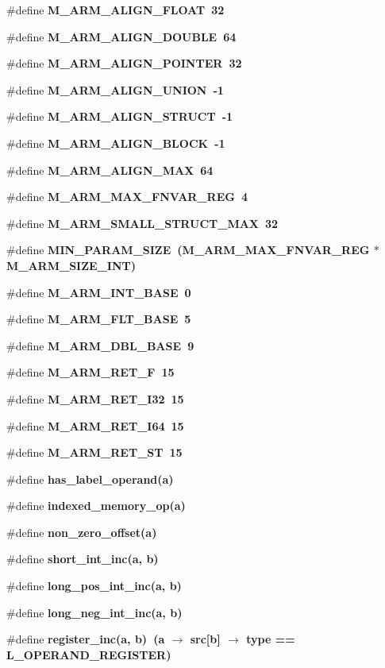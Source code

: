 \begin{CompactItemize}
\item 
\#define \bf{M\_\-ARM\_\-ALIGN\_\-FLOAT}~32
\item 
\#define \bf{M\_\-ARM\_\-ALIGN\_\-DOUBLE}~64
\item 
\#define \bf{M\_\-ARM\_\-ALIGN\_\-POINTER}~32
\item 
\#define \bf{M\_\-ARM\_\-ALIGN\_\-UNION}~-1
\item 
\#define \bf{M\_\-ARM\_\-ALIGN\_\-STRUCT}~-1
\item 
\#define \bf{M\_\-ARM\_\-ALIGN\_\-BLOCK}~-1
\item 
\#define \bf{M\_\-ARM\_\-ALIGN\_\-MAX}~64
\item 
\#define \bf{M\_\-ARM\_\-MAX\_\-FNVAR\_\-REG}~4
\item 
\#define \bf{M\_\-ARM\_\-SMALL\_\-STRUCT\_\-MAX}~32
\item 
\#define \bf{MIN\_\-PARAM\_\-SIZE}~(M\_\-ARM\_\-MAX\_\-FNVAR\_\-REG $\ast$  M\_\-ARM\_\-SIZE\_\-INT)
\item 
\#define \bf{M\_\-ARM\_\-INT\_\-BASE}~0
\item 
\#define \bf{M\_\-ARM\_\-FLT\_\-BASE}~5
\item 
\#define \bf{M\_\-ARM\_\-DBL\_\-BASE}~9
\item 
\#define \bf{M\_\-ARM\_\-RET\_\-F}~15
\item 
\#define \bf{M\_\-ARM\_\-RET\_\-I32}~15
\item 
\#define \bf{M\_\-ARM\_\-RET\_\-I64}~15
\item 
\#define \bf{M\_\-ARM\_\-RET\_\-ST}~15
\item 
\#define \bf{has\_\-label\_\-operand}(a)
\item 
\#define \bf{indexed\_\-memory\_\-op}(a)
\item 
\#define \bf{non\_\-zero\_\-offset}(a)
\item 
\#define \bf{short\_\-int\_\-inc}(a, b)
\item 
\#define \bf{long\_\-pos\_\-int\_\-inc}(a, b)
\item 
\#define \bf{long\_\-neg\_\-int\_\-inc}(a, b)
\item 
\#define \bf{register\_\-inc}(a, b)~(a $\rightarrow$ src[b] $\rightarrow$ type == L\_\-OPERAND\_\-REGISTER)
\end{CompactItemize}
